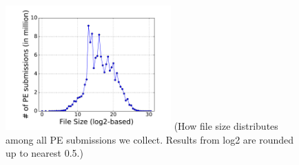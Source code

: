 \begin{figure}[t!]
\begin{center}
\includegraphics[width=2.5in]{figure/pesize}
{\footnotesize{(How file size distributes among all PE submissions we collect. 
Results from log2 are rounded up to nearest 0.5.)}}
\end{center}
\end{figure}